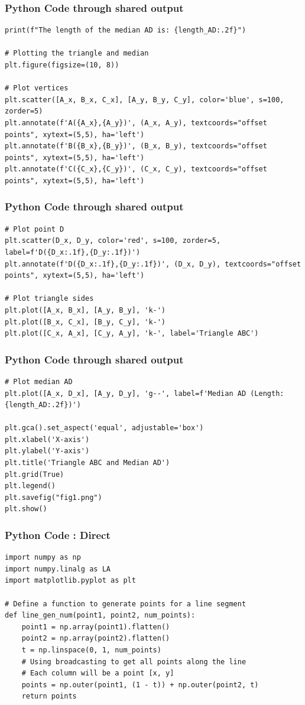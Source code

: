 \documentclass{beamer}
\begin{document}
    \begin{frame}[fragile]
\frametitle{Python Code through shared output }

\begin{lstlisting}
print(f"The length of the median AD is: {length_AD:.2f}")

# Plotting the triangle and median
plt.figure(figsize=(10, 8))

# Plot vertices
plt.scatter([A_x, B_x, C_x], [A_y, B_y, C_y], color='blue', s=100, zorder=5)
plt.annotate(f'A({A_x},{A_y})', (A_x, A_y), textcoords="offset points", xytext=(5,5), ha='left')
plt.annotate(f'B({B_x},{B_y})', (B_x, B_y), textcoords="offset points", xytext=(5,5), ha='left')
plt.annotate(f'C({C_x},{C_y})', (C_x, C_y), textcoords="offset points", xytext=(5,5), ha='left')

\end{lstlisting}
    \end{frame}
    \begin{frame}[fragile]
\frametitle{Python Code through shared output }
\begin{lstlisting}
# Plot point D
plt.scatter(D_x, D_y, color='red', s=100, zorder=5, label=f'D({D_x:.1f},{D_y:.1f})')
plt.annotate(f'D({D_x:.1f},{D_y:.1f})', (D_x, D_y), textcoords="offset points", xytext=(5,5), ha='left')

# Plot triangle sides
plt.plot([A_x, B_x], [A_y, B_y], 'k-')
plt.plot([B_x, C_x], [B_y, C_y], 'k-')
plt.plot([C_x, A_x], [C_y, A_y], 'k-', label='Triangle ABC')
\end{lstlisting}
    \end{frame}
    \begin{frame}[fragile]
\frametitle{Python Code through shared output }
\begin{lstlisting}
# Plot median AD
plt.plot([A_x, D_x], [A_y, D_y], 'g--', label=f'Median AD (Length: {length_AD:.2f})')

plt.gca().set_aspect('equal', adjustable='box')
plt.xlabel('X-axis')
plt.ylabel('Y-axis')
plt.title('Triangle ABC and Median AD')
plt.grid(True)
plt.legend()
plt.savefig("fig1.png")
plt.show()
\end{lstlisting}

\end{frame}
\begin{frame}[fragile]
\frametitle{Python Code : Direct}

\begin{lstlisting}
import numpy as np
import numpy.linalg as LA
import matplotlib.pyplot as plt

# Define a function to generate points for a line segment
def line_gen_num(point1, point2, num_points):
    point1 = np.array(point1).flatten()
    point2 = np.array(point2).flatten()
    t = np.linspace(0, 1, num_points)
    # Using broadcasting to get all points along the line
    # Each column will be a point [x, y]
    points = np.outer(point1, (1 - t)) + np.outer(point2, t)
    return points

\end{lstlisting}

\end{frame}
\end{document}
